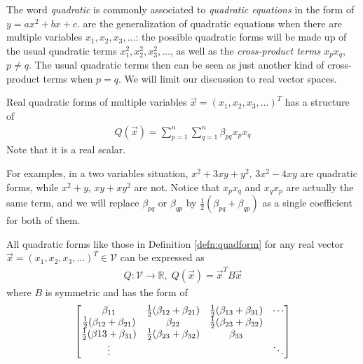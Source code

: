 The word \textit{quadratic} is commonly associated to \textit{quadratic equations} in the form of $y = ax^2 + bx + c$.  are the generalization of quadratic equations when there are multiple variables $x_1, x_2, x_3, \ldots$: the possible quadratic forms will be made up of the usual quadratic terms $x_1^2, x_2^2, x_3^2, \ldots$, as well as the \textit{cross-product terms} $x_px_q$, $p \neq q$. The usual quadratic terms then can be seen as just another kind of cross-product terms when $p = q$. We will limit our discussion to real vector spaces.
\begin{defn}
\label{defn:quadform}
Real quadratic forms of multiple variables $\vec{x} = (x_1, x_2, x_3, \ldots)^T$ has a structure of
\begin{align*}
Q(\vec{x}) = \sum_{p=1}^{n}\sum_{q=1}^{n} \beta_{pq} x_px_q
\end{align*}
Note that it is a real scalar.
\end{defn}
For examples, in a two variables situation, $x^2 + 3xy + y^2$, $3x^2 - 4xy$ are quadratic forms, while $x^2 + y$, $xy + xy^2$ are not. Notice that $x_px_q$ and $x_qx_p$ are actually the same term, and we will replace $\beta_{pq}$ or $\beta_{qp}$ by $\frac{1}{2}(\beta_{pq} + \beta_{qp})$ as a single coefficient for both of them. 
\begin{proper}
All quadratic forms like those in Definition \ref{defn:quadform} for any real vector $\vec{x} = (x_1, x_2, x_3, \ldots)^T \in \mathcal{V}$ can be expressed as
\begin{align*}
Q: \mathcal{V} \to \mathbb{R},\; Q(\vec{x}) = \vec{x}^TB\vec{x}
\end{align*}
where $B$ is symmetric and has the form of
\begin{align*}
\left[\begin{array}{@{}cccc@{}}
\beta_{11} & \frac{1}{2}(\beta_{12} + \beta_{21}) & \frac{1}{2}(\beta_{13} + \beta_{31}) & \cdots \\
\frac{1}{2}(\beta_{12} + \beta_{21}) & \beta_{22} & \frac{1}{2}(\beta_{23} + \beta_{32}) &  \\
\frac{1}{2}(\beta{13} + \beta_{31}) & \frac{1}{2}(\beta_{23} + \beta_{32}) & \beta_{33} &  \\
\vdots & & & \ddots
\end{array}\right]
\end{align*}
\end{proper}
